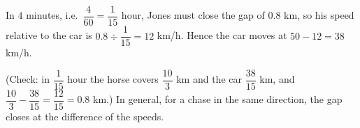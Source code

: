 In $4$ minutes, i.e.\ $\dfrac{4}{60}=\dfrac{1}{15}$ hour, Jones must close the gap of $0.8$ km, so his speed relative to the car is $0.8\div\dfrac{1}{15}=12$ km/h. Hence the car moves at $50-12=\boxed{38}$ km/h.

(Check: in $\dfrac{1}{15}$ hour the horse covers $\dfrac{10}{3}$ km and the car $\dfrac{38}{15}$ km, and $\dfrac{10}{3}-\dfrac{38}{15}=\dfrac{12}{15}=0.8$ km.) In general, for a chase in the same direction, the gap closes at the difference of the speeds.
